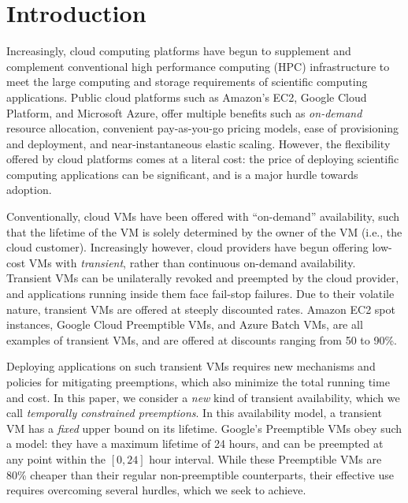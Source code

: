 \section{Introduction}
\label{sec:intro}

Increasingly, cloud computing platforms have begun to supplement and complement conventional high performance computing (HPC) infrastructure to meet the large computing and storage requirements of scientific computing applications. Public cloud platforms such as Amazon's EC2, Google Cloud Platform, and Microsoft Azure, offer multiple benefits such as \emph{on-demand} resource allocation, convenient pay-as-you-go pricing models, ease of provisioning and deployment, and near-instantaneous elastic scaling. 
However, the flexibility offered by cloud platforms comes at a literal cost: the price of deploying scientific computing applications can be significant, and is a major hurdle towards adoption. 

Conventionally, cloud VMs have been offered with ``on-demand'' availability, such that the lifetime of the VM is solely determined by the owner of the VM (i.e., the cloud customer). 
Increasingly however, cloud providers have begun offering low-cost VMs with \emph{transient}, rather than continuous on-demand availability. 
Transient VMs can be unilaterally revoked and preempted by the cloud provider, and applications running inside them face fail-stop failures. 
Due to their volatile nature, transient VMs are offered at steeply discounted rates. Amazon EC2 spot instances, Google Cloud Preemptible VMs, and Azure Batch VMs, are all examples of transient VMs, and are offered at discounts ranging from 50 to 90\%.  


Deploying applications on such transient VMs requires new mechanisms and policies for mitigating preemptions, which also minimize the total running time and cost.
%
In this paper, we consider a \emph{new} kind of transient availability, which we call \emph{temporally constrained preemptions}.
In this availability model, a transient VM has a \emph{fixed} upper bound on its lifetime.
Google's Preemptible VMs obey such a model: they have a maximum lifetime of 24 hours, and can be preempted at any point within the $[0, 24]$ hour interval.
While these Preemptible VMs are 80\% cheaper than their regular non-preemptible counterparts, their effective use requires overcoming several hurdles, which we seek to achieve.

